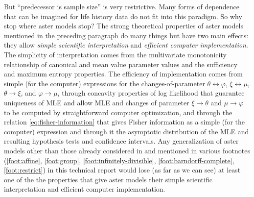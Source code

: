 \documentclass[11pt]{article}
\begin{document}
But ``predecessor is sample size'' is very restrictive.  Many forms of
dependence that can be imagined for life history data do not fit into this
paradigm.  So why stop where aster models stop?  The strong theoretical
properties of aster models mentioned in the preceding paragraph do many
things but have two main effects: they allow
\emph{simple scientific interpretation}
and \emph{efficient computer implementation}.
The simplicity of interpretation comes from
the multivariate monotonicity relationship of canonical and mean
value parameter values and the sufficiency and maximum entropy
properties.  The efficiency of implementation comes from
simple (for the computer) expressions for
the changes-of-parameter $\theta \leftrightarrow \varphi$,
$\xi \leftrightarrow \mu$, $\theta \to \xi$, and $\varphi \to \mu$,
through concavity properties of log likelihood that guarantee uniqueness
of MLE and allow MLE and changes of parameter $\xi \to \theta$
and $\mu \to \varphi$ to be computed by straightforward computer optimization,
and through the relation \eqref{eq:fisher-information} that gives Fisher
information as a simple (for the computer) expression
and through it the asymptotic distribution of the MLE and resulting
hypothesis tests and confidence intervals.
Any generalization of aster models other than those already
considered in \citet{gws} and mentioned in various footnotes
(\ref{foot:affine}, \ref{foot:group}, \ref{foot:infinitely-divisible},
\ref{foot:barndorff-complete}, \ref{foot:restrict}) in this technical report
would lose (as far as we can see) at least one of the the properties that
give aster models their simple scientific interpretation and efficient
computer implementation.
\end{document}
